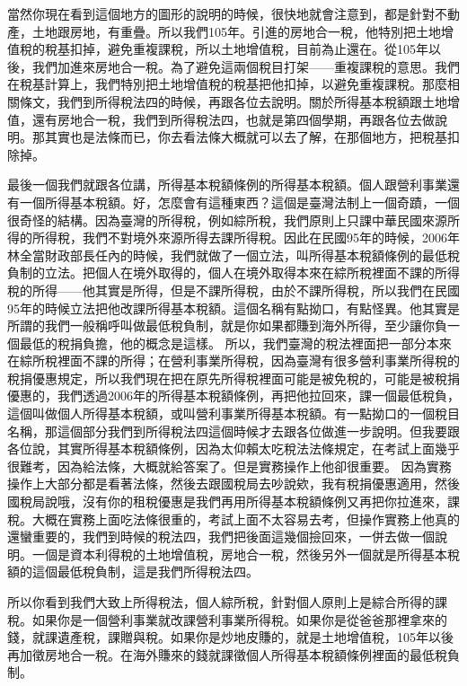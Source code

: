 \documentclass[]{ctexbook}
\begin{document}
當然你現在看到這個地方的圖形的說明的時候，很快地就會注意到，都是針對不動產，土地跟房地，有重疊。所以我們105年。引進的房地合一稅，他特別把土地增值稅的稅基扣掉，避免重複課稅，所以土地增值稅，目前為止還在。從105年以後，我們加進來房地合一稅。為了避免這兩個稅目打架------重複課稅的意思。我們在稅基計算上，我們特別把土地增值稅的稅基把他扣掉，以避免重複課稅。那麼相關條文，我們到所得稅法四的時候，再跟各位去說明。關於所得基本稅額跟土地增值，還有房地合一稅，我們到所得稅法四，也就是第四個學期，再跟各位去做說明。那其實也是法條而已，你去看法條大概就可以去了解，在那個地方，把稅基扣除掉。

最後一個我們就跟各位講，所得基本稅額條例的所得基本稅額。個人跟營利事業還有一個所得基本稅額。好，怎麼會有這種東西？這個是臺灣法制上一個奇蹟，一個很奇怪的結構。因為臺灣的所得稅，例如綜所稅，我們原則上只課中華民國來源所得的所得稅，我們不對境外來源所得去課所得稅。因此在民國95年的時候，2006年林全當財政部長任內的時候，我們就做了一個立法，叫所得基本稅額條例的最低稅負制的立法。把個人在境外取得的，個人在境外取得本來在綜所稅裡面不課的所得稅的所得------他其實是所得，但是不課所得稅，由於不課所得稅，所以我們在民國95年的時候立法把他改課所得基本稅額。這個名稱有點拗口，有點怪異。他其實是所謂的我們一般稱呼叫做最低稅負制，就是你如果都賺到海外所得，至少讓你負一個最低的稅捐負擔，他的概念是這樣。
所以，我們臺灣的稅法裡面把一部分本來在綜所稅裡面不課的所得；在營利事業所得稅，因為臺灣有很多營利事業所得稅的稅捐優惠規定，所以我們現在把在原先所得稅裡面可能是被免稅的，可能是被稅捐優惠的，我們透過2006年的所得基本稅額條例，再把他拉回來，課一個最低稅負，這個叫做個人所得基本稅額，或叫營利事業所得基本稅額。有一點拗口的一個稅目名稱，那這個部分我們到所得稅法四這個時候才去跟各位做進一步說明。但我要跟各位說，其實所得基本稅額條例，因為太仰賴太吃稅法法條規定，在考試上面幾乎很難考，因為給法條，大概就給答案了。但是實務操作上他卻很重要。
因為實務操作上大部分都是看著法條，然後去跟國稅局去吵說欸，我有稅捐優惠適用，然後國稅局說哦，沒有你的租稅優惠是我們再用所得基本稅額條例又再把你拉進來，課稅。大概在實務上面吃法條很重的，考試上面不太容易去考，但操作實務上他真的還蠻重要的，我們到時候的稅法四，我們把後面這幾個撿回來，一併去做一個說明。一個是資本利得稅的土地增值稅，房地合一稅，然後另外一個就是所得基本稅額的這個最低稅負制，這是我們所得稅法四。

所以你看到我們大致上所得稅法，個人綜所稅，針對個人原則上是綜合所得的課稅。如果你是一個營利事業就改課營利事業所得稅。如果你是從爸爸那裡拿來的錢，就課遺產稅，課贈與稅。如果你是炒地皮賺的，就是土地增值稅，105年以後再加徵房地合一稅。在海外賺來的錢就課徵個人所得基本稅額條例裡面的最低稅負制。
\end{document}
